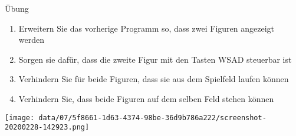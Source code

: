 \documentclass[presentation]{beamer}
\begin{document}
\begin{frame}[label={sec:org522f531}]{Übung}
\begin{enumerate}
\item Erweitern Sie das vorherige Programm so, dass zwei Figuren angezeigt werden
\item Sorgen sie dafür, dass die zweite Figur mit den Tasten WSAD steuerbar ist
\item Verhindern Sie für beide Figuren, dass sie aus dem Spielfeld laufen können
\item Verhindern Sie, dass beide Figuren auf dem selben Feld stehen können
\end{enumerate}
\begin{center}
\texttt{[image: data/07/5f8661-1d63-4374-98be-36d9b786a222/screenshot-20200228-142923.png]}
\end{center}
\end{frame}
\end{document}

